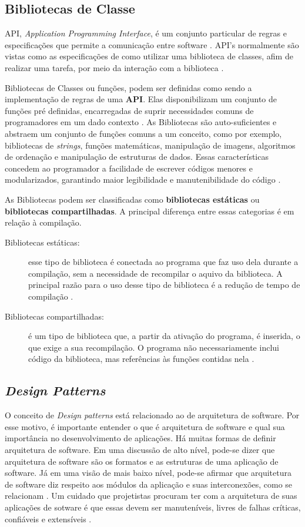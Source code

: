 \subsection{Bibliotecas de Classe}
API, \textit{Application Programming Interface}, é um conjunto particular de
regras e especificações que permite a comunicação entre  software
\cite{simsek2004}. API's normalmente são vistas como as especificações de como
utilizar uma biblioteca de classes, afim de realizar uma tarefa, por meio da
interação com a biblioteca \cite{simsek2004}.
\par
\indent Bibliotecas de Classes ou funções, podem ser definidas como sendo a
implementação de regras de uma \textbf{API}. Elas disponibilizam um conjunto de
funções pré definidas, encarregadas de suprir necessidades comuns de
programadores em um dado contexto \cite{simsek2004}. As Bibliotecas são
auto-suficientes e abstraem um conjunto de funções comuns a um conceito, como
por exemplo, bibliotecas de \textit{strings}, funções matemáticas, manipulação
de imagens, algoritmos de ordenação e manipulação de estruturas de dados. Essas
características concedem ao programador a facilidade de escrever códigos
menores e modularizados, garantindo maior legibilidade e manutenibilidade do
código \cite{simsek2004}.
\par
\indent As Bibliotecas podem ser classificadas como \textbf{bibliotecas estáticas}
ou \textbf{bibliotecas compartilhadas}. A principal diferença entre essas
categorias é em relação à compilação.
\begin{description}
\item[Bibliotecas estáticas:] esse tipo de biblioteca é conectada ao programa
que faz uso dela durante a compilação, sem a necessidade de recompilar o aquivo
da biblioteca. A principal razão para o uso desse tipo de biblioteca é a redução
de tempo de compilação \cite{simsek2004}.
\item[Bibliotecas compartilhadas:] é um tipo de biblioteca que, a partir da
ativação do programa, é inserida, o que exige a sua recompilação. O programa
não necessariamente inclui código da biblioteca, mas referências às funções
contidas nela \cite{simsek2004}.
\end{description}

\subsection{\textit{Design Patterns}}
O conceito de \textit{Design patterns} está relacionado ao de arquitetura de
software. Por esse motivo, é importante entender o que é arquitetura de software
e qual sua importância no desenvolvimento de aplicações. Há muitas formas de
definir arquitetura de software. Em uma discussão de alto nível, pode-se dizer
que arquitetura de software são os formatos e as estruturas de uma aplicação de
software. Já em uma visão de mais baixo nível, pode-se afirmar que arquitetura
de software diz respeito aos módulos da aplicação e suas interconexões, como se
relacionam \cite{martin2000}. Um cuidado que projetistas procuram ter com a
arquitetura de suas aplicações de sotware é que essas devem ser manuteníveis,
livres de falhas críticas, confiáveis e extensíveis \cite{kleinWeiss2009}.

